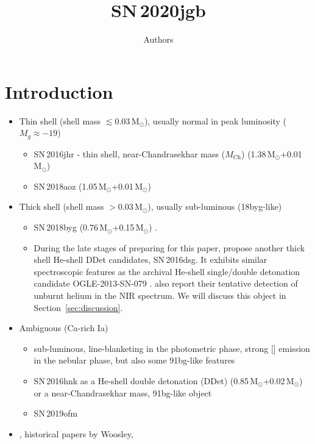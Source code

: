 \documentclass[twocolumn]{aastex631}
\newcommand{\sn}{SN\,2020jgb}
\newcommand{\Mch}{$M_\mathrm{Ch}$}
\begin{document}
\title{\sn}

\author{Authors}

\begin{abstract}

\end{abstract}


\section{Introduction} \label{sec:intro}
\begin{itemize}
    \item Thin shell (shell mass $\lesssim0.03\,\mathrm{M_\odot}$), usually normal in peak luminosity ($M_g\approx-19$)
    \begin{itemize}
        \item SN\,2016jhr \citep{jiang_16jhr_2017} - thin shell, near-Chandrasekhar mass (\Mch) (1.38\,$\mathrm{M_\odot}$+0.01\,$\mathrm{M_\odot}$)
        \item SN\,2018aoz (1.05\,$\mathrm{M_\odot}$+0.01\,$\mathrm{M_\odot}$)\citep{Ni_2022}
    \end{itemize}
    \item Thick shell (shell mass $>0.03\,\mathrm{M_\odot}$), usually sub-luminous (18byg-like)
    \begin{itemize}
        \item SN\,2018byg (0.76\,$\mathrm{M_\odot}$+0.15\,$\mathrm{M_\odot}$) \citep{de_18byg_2019}.
        \item During the late stages of preparing for this paper, \citet{Dong_16dsg_2022} propose another thick shell He-shell DDet candidates, SN\,2016dsg. It exhibits similar spectroscopic features as the archival He-shell single/double detonation candidate OGLE-2013-SN-079 \citep{Dessart_2015, Inserra_OGLE13_079_2015}. \citet{Dong_16dsg_2022} also report their tentative detection of unburnt helium in the NIR spectrum. We will discuss this object in Section~\ref{sec:discussion}.
    \end{itemize}
    \item Ambiguous (Ca-rich Ia)
    \begin{itemize}
        \item sub-luminous, line-blanketing in the photometric phase, strong [] emission in the nebular phase, but also some 91bg-like features
        \item SN\,2016hnk as a He-shell double detonation (DDet) \citep{jacobson-galan_16hnk_2020} (0.85\,$\mathrm{M_\odot}$+0.02\,$\mathrm{M_\odot}$) or a near-Chandrasekhar mass, 91bg-like object \citep{galbany_16hnk_2019}
        \item SN\,2019ofm \citep{de_Ca_rich_2020}
    \end{itemize}

        
    
    \item \citep{polin_observational_2019}, historical papers by Woosley, \citep{Boyle2017_Helium}
\end{itemize}
\end{document}
